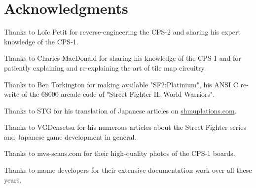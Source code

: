 \chapter{Acknowledgments} 

Thanks to Lo\"{i}c Petit for reverse-engineering the CPS-2 and sharing his expert knowledge of the CPS-1.

Thanks to Charles MacDonald for sharing his knowledge of the CPS-1 and for patiently explaining and re-explaining the art of tile map circuitry.

Thanks to Ben Torkington for making available "SF2:Platinium", his ANSI C re-write of the 68000 arcade code of "Street Fighter II: World Warriors".

Thanks to STG for his translation of Japanese articles on \href{https://shmuplations.com}{shmuplations.com}.

Thanks to VGDensetsu for his numerous articles about the Street Fighter series and Japanese game development in general.

Thanks to mvs-scans.com for their high-quality photos of the CPS-1 boards.

Thanks to mame developers for their extensive documentation work over all these years.